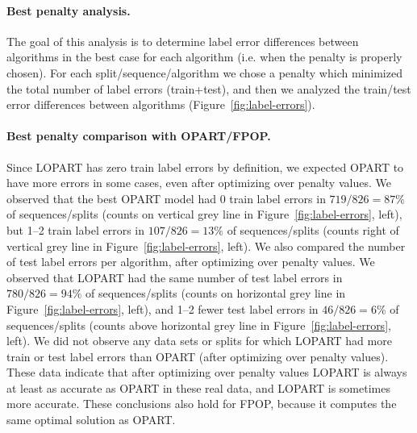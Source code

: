 \documentclass[12pt]{article}
\begin{document}
\paragraph{Best penalty analysis.} 
The goal of this analysis is to determine label error differences between algorithms in the best case for each algorithm (i.e. when the penalty is properly chosen).
For each split/sequence/algorithm we chose a penalty which minimized the total number of label errors (train+test), and then we analyzed the train/test error differences between algorithms (Figure~\ref{fig:label-errors}).

\paragraph{Best penalty comparison with OPART/FPOP.} 
Since LOPART has zero train label errors by definition, we expected OPART to have more errors in some cases, even after optimizing over penalty values.
We observed that the best OPART model had 0 train label errors in $719/826=87\%$ of sequences/splits (counts on vertical grey line in Figure~\ref{fig:label-errors}, left), but 1--2 train label errors in $107/826=13\%$ of sequences/splits (counts right of vertical grey line in Figure~\ref{fig:label-errors}, left).
We also compared the number of test label errors per algorithm, after optimizing over penalty values. 
We observed that LOPART had the same number of test label errors in $780/826=94\%$ of sequences/splits (counts on horizontal grey line in Figure~\ref{fig:label-errors}, left), and 1--2 fewer test label errors in $46/826=6\%$ of sequences/splits (counts above horizontal grey line in Figure~\ref{fig:label-errors}, left).
We did not observe any data sets or splits for which LOPART had more train or test label errors than OPART (after optimizing over penalty values).
These data indicate that after optimizing over penalty values LOPART is always at least as accurate as OPART in these real data, and LOPART is sometimes more accurate. These conclusions also hold for FPOP, because it computes the same optimal solution as OPART.
\end{document}
